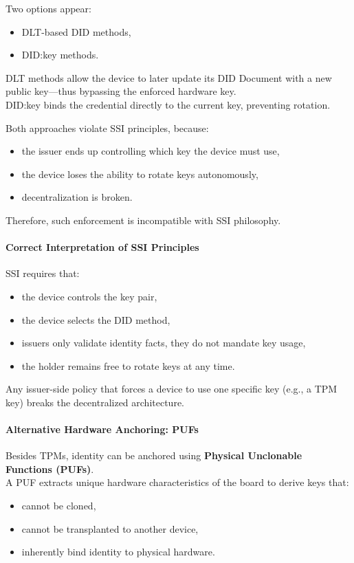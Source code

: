 \noindent
Two options appear:
\begin{itemize}
    \item DLT-based DID methods,
    \item DID:key methods.
\end{itemize}

\noindent
DLT methods allow the device to later update its DID Document with a new public key—thus bypassing the enforced hardware key.\\
DID:key binds the credential directly to the current key, preventing rotation.
\medskip

\noindent
Both approaches violate SSI principles, because:
\begin{itemize}
    \item the issuer ends up controlling which key the device must use,
    \item the device loses the ability to rotate keys autonomously,
    \item decentralization is broken.
\end{itemize}

\noindent
Therefore, such enforcement is incompatible with SSI philosophy.

\paragraph{Correct Interpretation of SSI Principles}
SSI requires that:
\begin{itemize}
    \item the device controls the key pair,
    \item the device selects the DID method,
    \item issuers only validate identity facts, they do not mandate key usage,
    \item the holder remains free to rotate keys at any time.
\end{itemize}
\medskip

\noindent
Any issuer-side policy that forces a device to use one specific key (e.g., a TPM key) breaks the decentralized architecture.

\paragraph{Alternative Hardware Anchoring: PUFs}
Besides TPMs, identity can be anchored using \textbf{Physical Unclonable
Functions (PUFs)}.\\
A PUF extracts unique hardware characteristics of the board to derive keys that:
\begin{itemize}
    \item cannot be cloned,
    \item cannot be transplanted to another device,
    \item inherently bind identity to physical hardware.
\end{itemize}
\medskip


